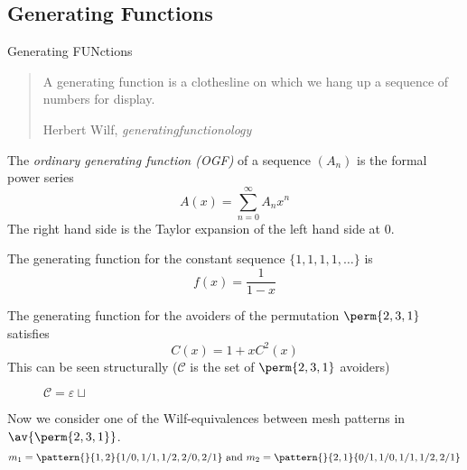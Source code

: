 \subsection{Generating Functions}
\label{sub:Generating Functions}
\begin{frame}{Generating {\huge FUN}ctions}
  \begin{block}{}
    \blockquote[Herbert Wilf, \emph{generatingfunctionology}~\cite{Wilf}]{%
    A generating function is a clothesline on which we hang up a sequence of numbers for display.}
  \end{block}
  \begin{definition}
    The \emph{ordinary generating function (OGF)} of a sequence \((A_n)\) is the
    formal power series
    \begin{equation}
      A(x) = \sum_{n=0}^{\infty} A_nx^n
    \end{equation}
    The right hand side is the Taylor expansion of the left hand side at \(0\).
  \end{definition}
\end{frame}
\begin{frame}
  \begin{example}
    The generating function for the constant sequence \(\{1,1,1,1,\dotsc\}\) is
    \begin{equation*}
      f(x) = \frac{1}{1-x}
    \end{equation*}
  \end{example}
\end{frame}
\begin{frame}
  \begin{example}
  The generating function for the avoiders of the permutation \(\perm{2,3,1}\)
  satisfies
  \begin{equation}
    C(x) = 1 +xC^2(x)
  \end{equation}
  This can be seen structurally (\(\mathcal{C}\) is the set of \(\perm{2,3,1}\) avoiders)
  \begin{figure}[!ht]
    \centering
    \(\mathcal{C} = \varepsilon \mathrel{\sqcup}\) 
\end{figure}

\end{example}
\end{frame}
\begin{frame}
  Now we consider one of the Wilf-equivalences between mesh patterns in \(\av{\perm{2,3,1}}\).
  \begin{equation*}
    m_1 = \pattern{}{1,2}{1/0,1/1,1/2,2/0,2/1} \text{ and }
    m_2 = \pattern{}{2,1}{0/1,1/0,1/1,1/2,2/1}
  \end{equation*}
\end{frame}

